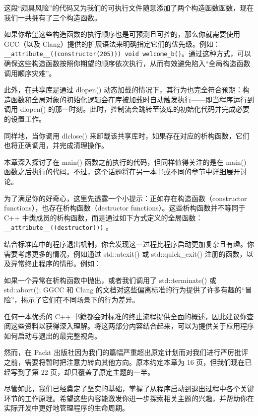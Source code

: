 这段“颇具风险”的代码又为我们的可执行文件随意添加了两个构造函数函数，现在我们一共拥有了三个构造函数。

如果你希望这些构造函数的执行顺序也是可预测且可控的，那么你就需要使用 GCC（以及 Clang）提供的扩展语法来明确指定它们的优先级。例如：\verb|__attribute__((constructor(205))) void welcome_b()|。通过这种方式，可以确保这些构造函数按照你期望的顺序依次执行，从而有效避免陷入“全局构造函数调用顺序灾难”。

此外，在共享库是通过 dlopen() 动态加载的情况下，其行为也完全符合预期：构造函数和全局对象的初始化逻辑会在库被加载时自动触发执行——即当程序运行到调用 dlopen() 的那一时刻。此时，控制流会跳转至该库的初始化代码并完成必要的设置工作。

同样地，当你调用 dlclose() 来卸载该共享库时，如果存在对应的析构函数，它们也将正确调用，并完成清理操作。


本章深入探讨了在 main() 函数之前执行的代码，但同样值得关注的是在 main() 函数之后执行的代码。不过，这个话题将在另一本书或不同的章节中详细展开讨论。

为了满足你的好奇心，这里先透露一个小提示：正如存在构造函数（constructor functions），也存在析构函数（destructor functions）。这些析构函数并不等同于 C++ 中类成员的析构函数，而是通过如下方式定义的全局函数： \verb|__attribute__((destructor)))| 。

结合标准库中的程序退出机制，你会发现这一过程比程序启动更加复杂且有趣。你需要考虑更多的情况，例如通过 std::atexit() 或 std::quick\_exit() 注册的函数，以及异常终止程序的情形。例如：

如果一个异常在析构函数中抛出，或者我们调用了 std::terminate() 或 std::abort(); GGCC 和 Clang 的文档对这些偏离标准的行为提供了许多有趣的“冒险”，揭示了它们在不同场景下的行为差异。

任何一本优秀的 C++ 书籍都会对标准的终止流程提供全面的概述，因此建议你查阅这些资料以获得深入理解。将这两部分内容结合起来，可以为提供关于应用程序如何启动与退出的最完整视角。

然而，在 Packt 出版社因为我们的篇幅严重超出原定计划而对我们进行严厉批评之前，需要将暂时把注意力转向其他方向。原本约定本章为 16 页，但我们现在已经写到了第 22 页，却只覆盖了原定主题的一半。

尽管如此，我们已经奠定了坚实的基础，掌握了从程序启动到退出过程中各个关键环节的工作原理。希望这些内容能激发你进一步探索相关主题的兴趣，并帮助你在实际开发中更好地管理程序的生命周期。